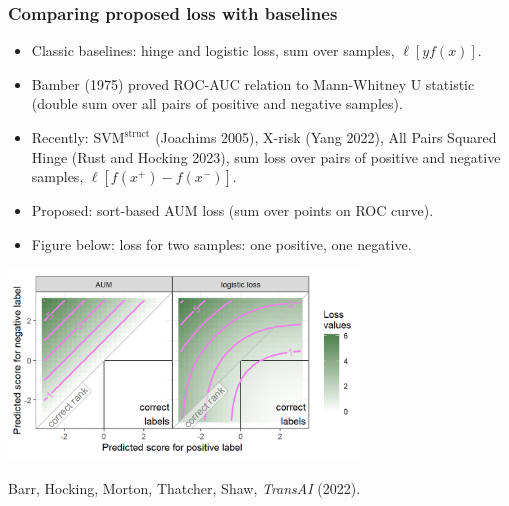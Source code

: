 \documentclass[t]{beamer}
\begin{document}
\begin{frame}
  \frametitle{Comparing proposed loss with baselines}
  \begin{itemize}
  \small
  \item Classic baselines: hinge and logistic loss, sum over samples, $\ell[yf(x)]$.
  \item Bamber (1975) proved ROC-AUC relation to Mann-Whitney
    U statistic (double sum over all pairs of positive and negative
    samples).
  \item Recently:  $\text{SVM}^{\text{struct}}$ (Joachims 2005),
    X-risk (Yang 2022), %
    All Pairs Squared Hinge (Rust and Hocking 2023),
    sum loss over pairs of positive and negative samples, $\ell[f(x^+)-f(x^-)]$.
  \item Proposed: sort-based AUM loss (sum over points on ROC curve).
  \item Figure below: loss for two samples: one positive, one negative.
  \end{itemize}

  \includegraphics[width=0.7\textwidth]{figure-compare-hinge-loss-contours-logistic.png}

    Barr, Hocking, Morton, Thatcher, Shaw, \emph{TransAI} (2022).

\end{frame}
\end{document}
